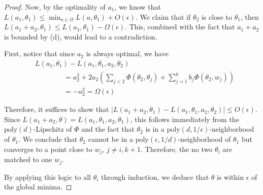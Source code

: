 \documentclass[a4paper,UKenglish]{lipics-v2016}
\newcommand{\poly}{\mathrm{poly}}
\begin{document}
\begin{proof}
Now, by the optimality of $a_1$, we know that $L(a_1,\theta_1) \leq \min_{a \in \Omega} L(a,\theta_1) + O(\epsilon)$. We claim that if $\theta_2$ is close to $\theta_1$, then $L(a_1+a_2,\theta_1) \leq L(a_1,\theta_1) - \Omega(\epsilon)$. This, combined with the fact that $a_1 + a_2$ is bounded by \poly(d), would lead to a contradiction.

First, notice that since $a_2$ is always optimal, we have
\begin{align*}
& L(a_1,\theta_1) - L(a_1,\theta_1,a_2,\theta_2) \\
& \qquad \qquad = a_2^2 + 2a_2 (\sum_{j < 2} \Phi(\theta_2,\theta_j) + \sum_{j=1}^k b_j \Phi(\theta_2,w_j)) \\
& \qquad \qquad = -a_2^2 = \Omega(\epsilon)
\end{align*}

Therefore, it suffices to show that $|L(a_1+a_2,\theta_1) - L(a_1,\theta_1,a_2,\theta_2) | \leq O(\epsilon)$. Since $L(a_1+a_2,\theta) = L(a_1,\theta_1,a_2,\theta_1)$, this follows immediately from the $\poly(d)$-Lipschitz of $\Phi$ and the fact that $\theta_2$ is in a $\poly(d,1/\epsilon)$-neighborhood of $\theta_1$. We conclude that $\theta_2$ cannot be in a $\poly(\epsilon,1/d)$-neighborhood of $\theta_1$ but converges to a point close to $w_{j}$, $j\neq i,k+1$. Therefore, the no two $\theta_i$ are matched to one $w_j$. 

By applying this logic to all $\theta_i$ through induction, we deduce that $\theta$ is within $\epsilon$ of the global minima.
\end{proof}
\fi
\end{document}
